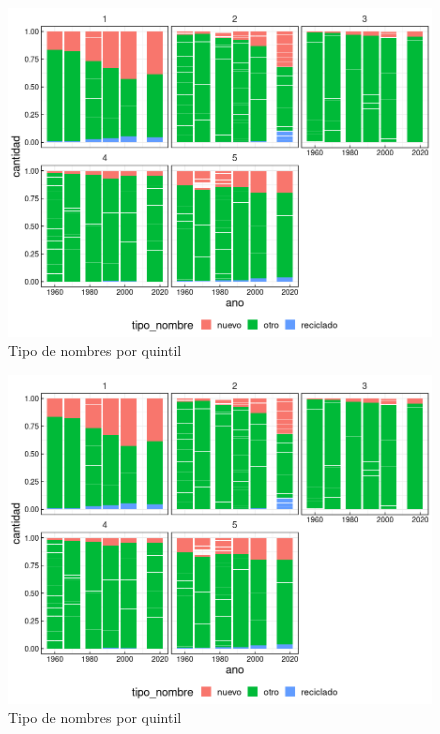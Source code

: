 \begin{landscape}
\begin{figure}[H]
\begin{center}
    \includegraphics[width=20cm]{plot/tipo_nombre_quintil.png}
    \caption{Tipo de nombres por quintil}
    \label{fig:tipo_nombre_quintil}
\end{center}
\end{figure}
\end{landscape}


\begin{landscape}
\begin{figure}[H]
\begin{center}
    \includegraphics[width=20cm]{plot/tipo_nombre_quintil.png}
    \caption{Tipo de nombres por quintil}
    \label{fig:tipo_nombre_quintil}
\end{center}
\end{figure}
\end{landscape}





